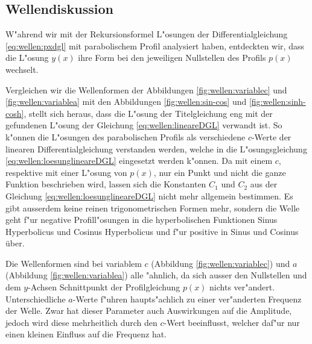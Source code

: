 \subsection{Wellendiskussion}
\label{sec:wellen:diskussionwellenform}
W"ahrend wir mit der Rekursionsformel L"osungen der Differentialgleichung 
\eqref{eq:wellen:pxdgl} mit parabolischem Profil analysiert haben, entdeckten 
wir, dass die L"osung $y(x)$ ihre Form bei den jeweiligen Nullstellen des 
Profils $p(x)$ wechselt.

Vergleichen wir die Wellenformen der Abbildungen \ref{fig:wellen:variablec} und 
\ref{fig:wellen:variablea} mit den Abbildungen \ref{fig:wellen:sin-cos} und 
\ref{fig:wellen:sinh-cosh}, stellt sich heraus, dass die L"osung der 
Titelgleichung eng mit der gefundenen L"osung der Gleichung 
\eqref{eq:wellen:lineareDGL} verwandt ist. So k"onnen die L"osungen des 
parabolischen Profils als verschiedene $c$-Werte der linearen 
Differentialgleichung verstanden werden, welche in die L"osungsgleichung 
\eqref{eq:wellen:loesunglineareDGL} eingesetzt werden k"onnen. 
Da mit einem $c$, respektive mit einer L"osung von $p(x)$, nur ein Punkt 
und nicht die ganze Funktion beschrieben wird, lassen sich die Konstanten $C_1$ 
und $C_2$ aus der Gleichung \eqref{eq:wellen:loesunglineareDGL} nicht mehr 
allgemein bestimmen. Es gibt ausserdem keine reinen trigonometrischen Formen 
mehr, sondern die Welle geht f"ur negative Profill"osungen in die 
hyperbolischen Funktionen Sinus Hyperbolicus und Cosinus Hyperbolicus und f"ur 
positive in Sinus und Cosinus über.

Die Wellenformen sind bei variablem $c$ (Abbildung \ref{fig:wellen:variablec}) 
und $a$ (Abbildung \ref{fig:wellen:variablea}) alle "ahnlich, da sich ausser 
den Nullstellen und dem $y$-Achsen Schnittpunkt der Profilgleichung $p(x)$ 
nichts ver"andert. Unterschiedliche $a$-Werte f"uhren haupts"achlich zu einer 
ver"anderten Frequenz der Welle. Zwar hat dieser Parameter auch Auswirkungen 
auf die Amplitude, jedoch wird diese mehrheitlich durch den $c$-Wert 
beeinflusst, welcher daf"ur nur einen kleinen Einfluss auf die Frequenz hat.

